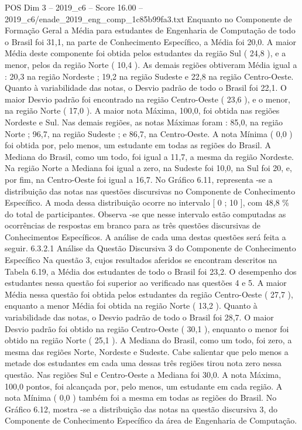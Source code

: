 \begin{textsample}{POS Dim 3 – 2019\_c6 – Score 16.00 – 2019\_c6/enade\_2019\_eng\_comp\_1c85b99fa3.txt}
Enquanto no Componente de Formação Geral a Média para estudantes de Engenharia de Computação de todo o Brasil foi 31,1, na parte de Conhecimento Específico, a Média foi 20,0.
A maior Média deste componente foi obtida pelos estudantes da região Sul ( 24,8 ), e a menor, pelos da região Norte ( 10,4 ).
As demais regiões obtiveram Média igual a : 20,3 na região Nordeste ; 19,2 na região Sudeste e 22,8 na região Centro-Oeste.
Quanto à variabilidade das notas, o Desvio padrão de todo o Brasil foi 22,1.
O maior Desvio padrão foi encontrado na região Centro-Oeste ( 23,6 ), e o menor, na região Norte ( 17,0 ).
A maior nota Máxima, 100,0, foi obtida nas regiões Nordeste e Sul.
Nas demais regiões, as notas Máximas foram : 85,0, na região Norte ; 96,7, na região Sudeste ; e 86,7, na Centro-Oeste.
A nota Mínima ( 0,0 ) foi obtida por, pelo menos, um estudante em todas as regiões do Brasil.
A Mediana do Brasil, como um todo, foi igual a 11,7, a mesma da região Nordeste.
Na região Norte a Mediana foi igual a zero, na Sudeste foi 10,0, na Sul foi 20, e, por fim, na Centro-Oeste foi igual a 16,7.
No Gráfico 6.11, representa -se a distribuição das notas nas questões discursivas no Componente de Conhecimento Específico.
A moda dessa distribuição ocorre no intervalo [ 0 ; 10 ], com 48,8 \% do total de participantes.
Observa -se que nesse intervalo estão computadas as ocorrências de respostas em branco para as três questões discursivas de Conhecimentos Específicos.
A análise de cada uma destas questões será feita a seguir. 6.3.2.1 Análise da Questão Discursiva 3 do Componente de Conhecimento Específico Na questão 3, cujos resultados aferidos se encontram descritos na Tabela 6.19, a Média dos estudantes de todo o Brasil foi 23,2.
O desempenho dos estudantes nessa questão foi superior ao verificado nas questões 4 e 5.
A maior Média nessa questão foi obtida pelos estudantes da região Centro-Oeste ( 27,7 ), enquanto a menor Média foi obtida na região Norte ( 13,2 ).
Quanto à variabilidade das notas, o Desvio padrão de todo o Brasil foi 28,7.
O maior Desvio padrão foi obtido na região Centro-Oeste ( 30,1 ), enquanto o menor foi obtido na região Norte ( 25,1 ).
A Mediana do Brasil, como um todo, foi zero, a mesma das regiões Norte, Nordeste e Sudeste.
Cabe salientar que pelo menos a metade dos estudantes em cada uma dessas três regiões tirou nota zero nessa questão.
Nas regiões Sul e Centro-Oeste a Mediana foi 30,0.
A nota Máxima, 100,0 pontos, foi alcançada por, pelo menos, um estudante em cada região.
A nota Mínima ( 0,0 ) também foi a mesma em todas as regiões do Brasil.
No Gráfico 6.12, mostra -se a distribuição das notas na questão discursiva 3, do Componente de Conhecimento Específico da área de Engenharia de Computação.

\end{textsample}

